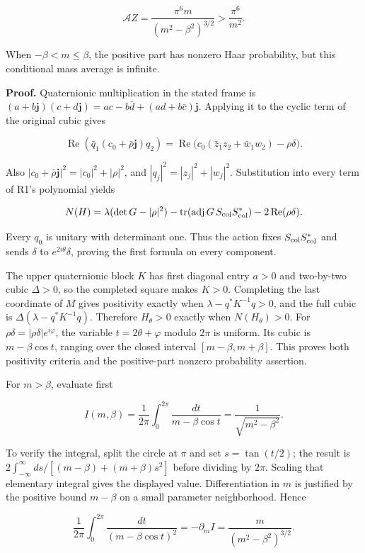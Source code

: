 \documentclass[
  11pt,
]{article}
\begin{document}
\[
\mathcal A Z=\frac{\pi^6 m}{(m^2-\beta^2)^{3/2}}
>\frac{\pi^6}{m^2}.
\]

When \(-\beta<m\le\beta\), the positive part has nonzero Haar
probability, but this conditional mass average is infinite.

\textbf{Proof.} Quaternionic multiplication in the stated frame is
\((a+b\mathbf j)(c+d\mathbf j)=ac-b\bar d+(ad+b\bar c)\mathbf j\).
Applying it to the cyclic term of the original cubic gives

\[
\operatorname{Re}(\bar q_1(c_0+\bar\rho\mathbf j)q_2)
=\operatorname{Re}\bigl(c_0(\bar z_1z_2+\bar w_1w_2)-\rho\delta\bigr).
\]

Also \(|c_0+\bar\rho\mathbf j|^2=|c_0|^2+|\rho|^2\), and
\(|q_j|^2=|z_j|^2+|w_j|^2\). Substitution into every term of R1's
polynomial yields

\[
N(H)=\lambda(\det G-|\rho|^2)
-\operatorname{tr}(\operatorname{adj}G\,S_{\rm col}S_{\rm col}^*)
-2\operatorname{Re}(\rho\delta).
\]

Every \(q_0\) is unitary with determinant one. Thus the action fixes
\(S_{\rm col}S_{\rm col}^*\) and sends \(\delta\) to
\(e^{2i\theta}\delta\), proving the first formula on every component.

The upper quaternionic block \(K\) has first diagonal entry \(a>0\) and
two-by-two cubic \(\Delta>0\), so the completed square makes \(K>0\).
Completing the last coordinate of \(M\) gives positivity exactly when
\(\lambda-q^*K^{-1}q>0\), and the full cubic is
\(\Delta(\lambda-q^*K^{-1}q)\). Therefore \(H_\theta>0\) exactly when
\(N(H_\theta)>0\). For \(\rho\delta=|\rho\delta|e^{i\varphi}\), the
variable \(t=2\theta+\varphi\) modulo \(2\pi\) is uniform. Its cubic is
\(m-\beta\cos t\), ranging over the closed interval
\([m-\beta,m+\beta]\). This proves both positivity criteria and the
positive-part nonzero probability assertion.

For \(m>\beta\), evaluate first

\[
I(m,\beta)=\frac1{2\pi}\int_0^{2\pi}\frac{dt}{m-\beta\cos t}
=\frac1{\sqrt{m^2-\beta^2}}.
\]

To verify the integral, split the circle at \(\pi\) and set
\(s=\tan(t/2)\); the result is
\(2\int_{-\infty}^{\infty}ds/[(m-\beta)+(m+\beta)s^2]\) before dividing
by \(2\pi\). Scaling that elementary integral gives the displayed value.
Differentiation in \(m\) is justified by the positive bound \(m-\beta\)
on a small parameter neighborhood. Hence

\[
\frac1{2\pi}\int_0^{2\pi}\frac{dt}{(m-\beta\cos t)^2}
=-\partial_m I=\frac{m}{(m^2-\beta^2)^{3/2}}.
\]
\end{document}
